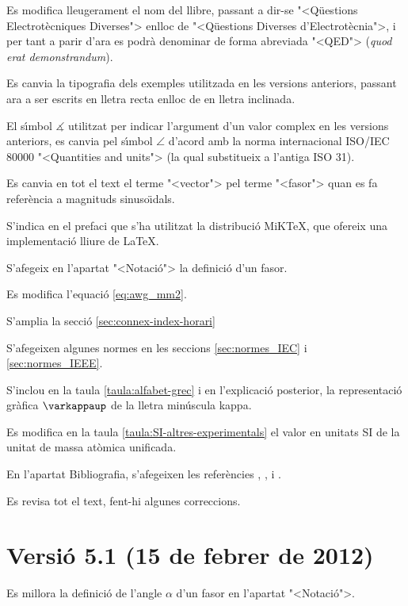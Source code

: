 Es modifica lleugerament el nom del llibre, passant a dir-se {"<}Q\"{u}estions Electrot\`{e}cniques Diverses{">} enlloc de {"<}Q\"{u}estions Diverses d'Electrot\`{e}cnia{">}, i per tant a parir d'ara es podr\`{a} denominar de forma abreviada {"<}QED{">} (\emph{quod erat demonstrandum}).

Es canvia la tipografia dels exemples utilitzada en les versions anteriors, passant ara a ser escrits en lletra recta enlloc de en lletra inclinada.

El s\'{\i}mbol $\measuredangle$ utilitzat per indicar l'argument d'un valor complex en les versions anteriors, es canvia pel s\'{\i}mbol $\angle$ d'acord amb la norma internacional \textsf{ISO/IEC 80000} {"<}Quantities and units{">} (la qual substitueix a l'antiga \textsf{ISO 31}).

Es canvia en tot el text el terme {"<}vector{">} pel terme {"<}fasor{">} quan es fa refer\`{e}ncia a magnituds sinuso\"{\i}dals.

S'indica en el prefaci que s'ha utilitzat la distribuci\'{o} MiK\TeX, que ofereix una implementaci\'{o} lliure de \LaTeX.

S'afegeix en l'apartat {"<}Notaci\'{o}{">} la definici\'{o} d'un fasor.

Es modifica l'equaci\'{o} \eqref{eq:awg_mm2}.

S'amplia la secci\'{o} \ref{sec:connex-index-horari}

S'afegeixen algunes normes en les seccions \ref{sec:normes_IEC} i \ref{sec:normes_IEEE}.

S'inclou en la taula \ref{taula:alfabet-grec} i en l'explicaci\'{o} posterior, la representaci\'{o} gr\`{a}fica $\varkappaup$ de la lletra min\'{u}scula kappa.

Es modifica en la taula \ref{taula:SI-altres-experimentals} el valor en unitats SI de la unitat de massa at\`{o}mica unificada.

En l'apartat Bibliografia, s'afegeixen les refer\`{e}ncies \cite{GRZ}, \cite{DUN}, \cite{REI} i \cite{TLE}.

Es revisa tot el text, fent-hi algunes correccions.

\section*{Versi\'{o} 5.1 (15 de febrer de 2012)}

Es millora la definici\'{o} de l'angle $\alpha$ d'un fasor en l'apartat {"<}Notaci\'{o}{">}.

